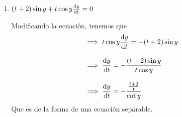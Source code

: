 \documentclass[14pt]{extarticle}
\begin{document}
\begin{enumerate}
{\begin{enumerate}
{                    Y queda como incógnita $g(x)$, pero se puede obtener usando
                    el hecho de que $M$ es la derivada respecto a $x$ de la
                    primitiva\\[.3cm]
                    
                    \begin{align*}
                        M = \dv{\phi(x, y)}{x}
                        &= \dv{(e^{xy}\cos{2x} - 3y + g(x))}{x} \\[.3cm]
                        ye^{xy}\cos{2x} - 2e^{xy}\sen{2x} + 2x
                        &= ye^{xy}\cos{2x} - 2e^{xy}\sen{2x} + g'(x)\\[.3cm]
                        \implies g'(x) = 2x &\implies g(x) = \int{2xdx} = x^{2}
                    \end{align*}
                    Por lo que la primitiva sin incógnitas es
                    \[\phi(x, y) = e^{xy}\cos{2x} - 3y + x^2 + C\]
                    Luego, despejando $y$.
                    \begin{align*}
                        \implies e^{xy}\cos{2x} &= 3y - x^2 - C\\[.3cm]
                        \implies e^{xy} &= \frac{3y - x^2 - C}{\cos{2x}} \\[.3cm]
                        \implies xy &= ln(\frac{3y - x^2 - C}{\cos{2x}}) \\[.3cm]
                        \implies y &= \frac{1}{x}ln(\frac{3y - x^2 - C}{\cos{2x}}) 
                    \end{align*}
                    Vemos que y no se puede despejar, pero se pueden aproximar las
                    soluciones con métodos de aproximaciones numéricas.\\[8cm]
                    
                    
                }

                \item {
                    $(t+2)\sin{y}+t\cos{y}\dv{y}{t}=0$

                    \color{azul}
                    Modificando la ecuación, tenemos que
                    \begin{align*}
                        &\implies t\cos{y}\dv{y}{t} = -(t+2)\sin{y} \\[.3cm]
                        &\implies \dv{y}{t} = -\frac{(t+2)\sin{y}}{t\cos{y}} \\[.3cm]
                        &\implies \dv{y}{t} = -\frac{\frac{t+2}{t}}{\cot{y}}
                    \end{align*}
                    Que es de la forma de una ecuación separable.\\[.3cm]

}
\end{enumerate}}
\end{enumerate}
\end{document}
